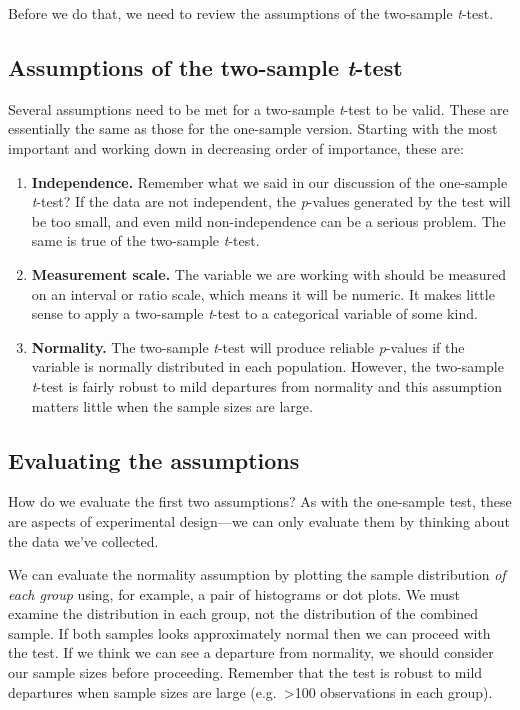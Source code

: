 \documentclass[
]{book}
\begin{document}
Before we do that, we need to review the assumptions of the two-sample \emph{t}-test.

\hypertarget{assumptions-of-the-two-sample-t-test}{%
\subsection{\texorpdfstring{Assumptions of the two-sample \emph{t}-test}{Assumptions of the two-sample t-test}}\label{assumptions-of-the-two-sample-t-test}}

Several assumptions need to be met for a two-sample \emph{t}-test to be valid. These are essentially the same as those for the one-sample version. Starting with the most important and working down in decreasing order of importance, these are:

\begin{enumerate}
\def\labelenumi{\arabic{enumi}.}
\item
  \textbf{Independence.} Remember what we said in our discussion of the one-sample \emph{t}-test? If the data are not independent, the \emph{p}-values generated by the test will be too small, and even mild non-independence can be a serious problem. The same is true of the two-sample \emph{t}-test.
\item
  \textbf{Measurement scale.} The variable we are working with should be measured on an interval or ratio scale, which means it will be numeric. It makes little sense to apply a two-sample \emph{t}-test to a categorical variable of some kind.
\item
  \textbf{Normality.} The two-sample \emph{t}-test will produce reliable \emph{p}-values if the variable is normally distributed in each population. However, the two-sample \emph{t}-test is fairly robust to mild departures from normality and this assumption matters little when the sample sizes are large.
\end{enumerate}

\hypertarget{evaluating-the-assumptions-1}{%
\subsection{Evaluating the assumptions}\label{evaluating-the-assumptions-1}}

How do we evaluate the first two assumptions? As with the one-sample test, these are aspects of experimental design---we can only evaluate them by thinking about the data we've collected.

We can evaluate the normality assumption by plotting the sample distribution \emph{of each group} using, for example, a pair of histograms or dot plots. We must examine the distribution in each group, not the distribution of the combined sample. If both samples looks approximately normal then we can proceed with the test. If we think we can see a departure from normality, we should consider our sample sizes before proceeding. Remember that the test is robust to mild departures when sample sizes are large (e.g.~\textgreater100 observations in each group).
\end{document}
